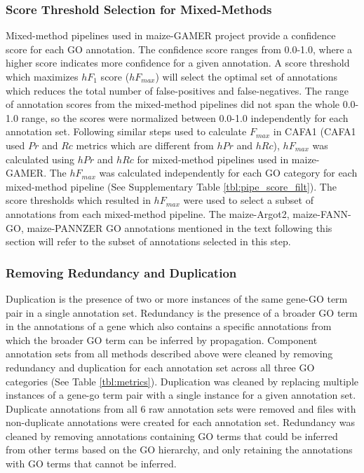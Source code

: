 \subsubsection{Score Threshold Selection for Mixed-Methods} \label{subsubsec:filter_pipeline}
Mixed-method pipelines used in maize-GAMER project provide a confidence score for each GO annotation. The confidence score ranges from 0.0-1.0, where a higher score indicates more confidence for a given annotation. A score threshold which maximizes $hF_1$ score ($hF_{max}$) will select the optimal set of annotations which reduces the total number of false-positives and false-negatives. The range of annotation scores from the mixed-method pipelines did not span the whole 0.0-1.0 range, so the scores were normalized between 0.0-1.0 independently for each annotation set. Following similar steps used to calculate $F_{max}$ in CAFA1 (CAFA1 used $Pr$ and $Rc$ metrics which are different from $hPr$ and $hRc$), $hF_{max}$ was calculated using $hPr$ and $hRc$ for mixed-method pipelines used in maize-GAMER. The $hF_{max}$ was calculated independently for each GO category for each mixed-method pipeline (See Supplementary Table \ref{tbl:pipe_score_filt}). The score thresholds which resulted in $hF_{max}$ were used to select a subset of annotations from each mixed-method pipeline. The maize-Argot2, maize-FANN-GO, maize-PANNZER GO annotations mentioned in the text following this section will refer to the subset of annotations selected in this step.

\subsubsection{Removing Redundancy and Duplication}
Duplication is the presence of two or more instances of the same gene-GO term pair in a single annotation set. Redundancy is the presence of a broader GO term in the annotations of a gene which also contains a specific annotations from which the broader GO term can be inferred by propagation. Component annotation sets from all methods described above were cleaned by removing redundancy and duplication for each annotation set across all three GO categories (See Table \ref{tbl:metrics}). Duplication was cleaned by replacing multiple instances of a gene-go term pair with a single instance for a given annotation set. Duplicate annotations from all 6 raw annotation sets were removed and files with non-duplicate annotations were created for each annotation set. Redundancy was cleaned by removing annotations containing GO terms that could be inferred from other terms based on the GO hierarchy, and only retaining the annotations with GO terms that cannot be inferred.

